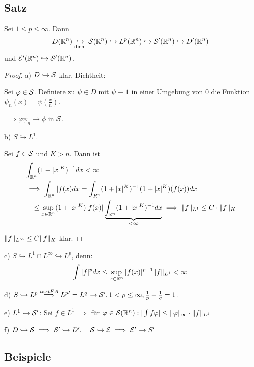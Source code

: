 \subsection{Satz}

Sei $1 \leq p \leq \infty$. 
Dann
$$
D(\mathbb{R}^n) \underset{\text{dicht}}{\hookrightarrow} \mathcal{S}(\mathbb{R}^n) \hookrightarrow L^p(\mathbb{R}^n) \hookrightarrow \mathcal{S}'(\mathbb{R}^n) \hookrightarrow D'(\mathbb{R}^n)
$$
und $\mathcal{E}'(\mathbb{R}^n) \hookrightarrow \mathcal{S}'(\mathbb{R}^n)$.

\begin{proof}
  a) $D \hookrightarrow \mathcal{S}$ klar. Dichtheit:

  Sei $\varphi \in \mathcal{S}$. 
  Definiere zu $\psi \in D$ mit $\psi \equiv 1$ in einer Umgebung von $0$ die Funktion $\psi_n(x) = \psi(\frac{x}{n})$.

  $\implies \varphi\psi_n \to \phi$ in $\mathcal{S}$.

  b) $S \hookrightarrow L^1$.

  Sei $f \in \mathcal{S}$ und $K > n$. 
  Dann ist
  \begin{align*}
  &  \int_{\mathbb{R}^n} (1 + |x|^K)^{-1} dx < \infty \\
  &\implies \int_{\mathbb{R}^n} |f(x) dx = \int_{R^n} (1 + |x|^K)^{-1} (1 + |x|^K)(f(x)) dx \\
  &\quad\leq \sup_{x \in \mathbb{R}^n} (1 + |x|^K) |f(x)| \underbrace{\int_{\mathbb{R}^n} (1 + |x|^K)^{-1} dx}_{< \infty} \implies \lVert f \rVert_{L^1} \leq C \cdot \lVert f \rVert_K
  \end{align*}

  $\lVert f \rVert_{L^\infty} \leq C \lVert f \rVert_K$ klar.
\end{proof}

c) $S \hookrightarrow L^1 \cap L^\infty \hookrightarrow L^p$, denn:
$$
\int |f|^p dx \leq \sup_{x \in \mathbb{R}^n} |f(x)|^{p-1} \lVert f \rVert_{L^1} < \infty
$$

d) $S \hookrightarrow L^p \overset{text{FA}}{\implies} {L^{p}}' = L^q \hookrightarrow \mathcal{S}', 1 < p \leq \infty, \frac{1}{p} + \frac{1}{q} = 1$.

e) $L^1 \hookrightarrow \mathcal{S}'$: Sei $f \in L^1 \implies $ für $ \varphi \in \mathcal{S}(\mathbb{R}^n): |\int f \varphi| \leq \lVert \varphi \rVert_\infty \cdot \lVert f \rVert_{L^1}$

f) $D \hookrightarrow \mathcal{S} \implies \mathcal{S}' \hookrightarrow D', \quad \mathcal{S} \hookrightarrow \mathcal{E} \implies \mathcal{E}' \hookrightarrow S'$

\subsection{Beispiele}

